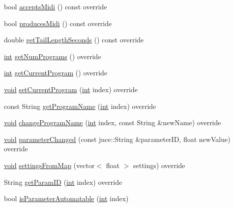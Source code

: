 \begin{DoxyCompactItemize}
\item 
bool \hyperlink{class_audealize_1_1_audealizeeq_audio_processor_a9e820616ada66ac1788fbaa48f1afd40}{accepts\+Midi} () const  override
\item 
bool \hyperlink{class_audealize_1_1_audealizeeq_audio_processor_a784691486ca80271a1f2fcee9ad32542}{produces\+Midi} () const  override
\item 
double \hyperlink{class_audealize_1_1_audealizeeq_audio_processor_a2c3fb8c06b4ffe89c921b961fa73af25}{get\+Tail\+Length\+Seconds} () const  override
\item 
\hyperlink{tk_8h_a83f82f76e7fed06f4c49d2db94028a6d}{int} \hyperlink{class_audealize_1_1_audealizeeq_audio_processor_a11bd93cafb127cdbc624e16f62582d52}{get\+Num\+Programs} () override
\item 
\hyperlink{tk_8h_a83f82f76e7fed06f4c49d2db94028a6d}{int} \hyperlink{class_audealize_1_1_audealizeeq_audio_processor_a5cb00c25aa26c2b65b6a848a415342bd}{get\+Current\+Program} () override
\item 
\hyperlink{tk_8h_aba408b7cd755a96426e004c015f5de8e}{void} \hyperlink{class_audealize_1_1_audealizeeq_audio_processor_ab6d138c59bb721764c33d4af3f26e97e}{set\+Current\+Program} (\hyperlink{tk_8h_a83f82f76e7fed06f4c49d2db94028a6d}{int} index) override
\item 
const String \hyperlink{class_audealize_1_1_audealizeeq_audio_processor_adce52ddadf23a6731b91685eb2693ca1}{get\+Program\+Name} (\hyperlink{tk_8h_a83f82f76e7fed06f4c49d2db94028a6d}{int} index) override
\item 
\hyperlink{tk_8h_aba408b7cd755a96426e004c015f5de8e}{void} \hyperlink{class_audealize_1_1_audealizeeq_audio_processor_aa77d0be3fce3b96cd822902b55e2d984}{change\+Program\+Name} (\hyperlink{tk_8h_a83f82f76e7fed06f4c49d2db94028a6d}{int} index, const String \&new\+Name) override
\item 
\hyperlink{tk_8h_aba408b7cd755a96426e004c015f5de8e}{void} \hyperlink{class_audealize_1_1_audealizeeq_audio_processor_a25c85696329c21a201963733bc46d957}{parameter\+Changed} (const juce\+::\+String \&parameter\+ID, float new\+Value) override
\item 
\hyperlink{tk_8h_aba408b7cd755a96426e004c015f5de8e}{void} \hyperlink{class_audealize_1_1_audealizeeq_audio_processor_adda624ec0e28dbc41777aa76ed9ce974}{settings\+From\+Map} (vector$<$ float $>$ settings) override
\item 
String \hyperlink{class_audealize_1_1_audealizeeq_audio_processor_a692e0576747a20bc080b971dccd84241}{get\+Param\+ID} (\hyperlink{tk_8h_a83f82f76e7fed06f4c49d2db94028a6d}{int} index) override
\item 
bool \hyperlink{class_audealize_1_1_audealizeeq_audio_processor_a1e14e27cbd9ea51776deccfd0ec4f4a8}{is\+Parameter\+Automatable} (\hyperlink{tk_8h_a83f82f76e7fed06f4c49d2db94028a6d}{int} index)
\end{DoxyCompactItemize}
